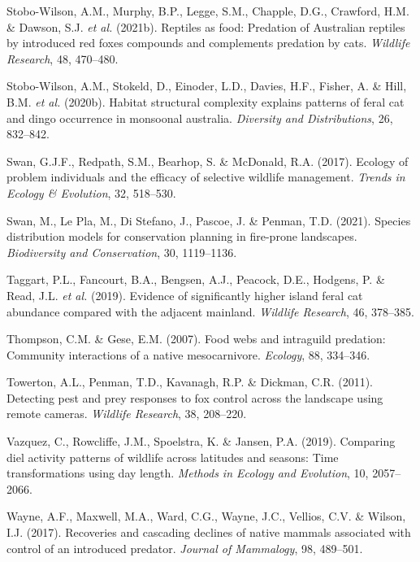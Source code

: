 \documentclass[11pt,a4paper,titlepage,twoside,openright]{style/unimelbthesis}
\begin{document}
\begin{mainmatter}
\leavevmode\hypertarget{ref-stobo2021reptiles}{}%
Stobo-Wilson, A.M., Murphy, B.P., Legge, S.M., Chapple, D.G., Crawford, H.M. \& Dawson, S.J. \emph{et al.} (2021b). Reptiles as food: Predation of Australian reptiles by introduced red foxes compounds and complements predation by cats. \emph{Wildlife Research}, 48, 470--480.

\leavevmode\hypertarget{ref-stobo2020habitat}{}%
Stobo-Wilson, A.M., Stokeld, D., Einoder, L.D., Davies, H.F., Fisher, A. \& Hill, B.M. \emph{et al.} (2020b). Habitat structural complexity explains patterns of feral cat and dingo occurrence in monsoonal australia. \emph{Diversity and Distributions}, 26, 832--842.

\leavevmode\hypertarget{ref-swan2017ecology}{}%
Swan, G.J.F., Redpath, S.M., Bearhop, S. \& McDonald, R.A. (2017). Ecology of problem individuals and the efficacy of selective wildlife management. \emph{Trends in Ecology \& Evolution}, 32, 518--530.

\leavevmode\hypertarget{ref-swan2021species}{}%
Swan, M., Le Pla, M., Di Stefano, J., Pascoe, J. \& Penman, T.D. (2021). Species distribution models for conservation planning in fire-prone landscapes. \emph{Biodiversity and Conservation}, 30, 1119--1136.

\leavevmode\hypertarget{ref-taggart2019evidence}{}%
Taggart, P.L., Fancourt, B.A., Bengsen, A.J., Peacock, D.E., Hodgens, P. \& Read, J.L. \emph{et al.} (2019). Evidence of significantly higher island feral cat abundance compared with the adjacent mainland. \emph{Wildlife Research}, 46, 378--385.

\leavevmode\hypertarget{ref-thompson2007food}{}%
Thompson, C.M. \& Gese, E.M. (2007). Food webs and intraguild predation: Community interactions of a native mesocarnivore. \emph{Ecology}, 88, 334--346.

\leavevmode\hypertarget{ref-towerton2011detecting}{}%
Towerton, A.L., Penman, T.D., Kavanagh, R.P. \& Dickman, C.R. (2011). Detecting pest and prey responses to fox control across the landscape using remote cameras. \emph{Wildlife Research}, 38, 208--220.

\leavevmode\hypertarget{ref-vazquez2019comparing}{}%
Vazquez, C., Rowcliffe, J.M., Spoelstra, K. \& Jansen, P.A. (2019). Comparing diel activity patterns of wildlife across latitudes and seasons: Time transformations using day length. \emph{Methods in Ecology and Evolution}, 10, 2057--2066.

\leavevmode\hypertarget{ref-wayne2017recoveries}{}%
Wayne, A.F., Maxwell, M.A., Ward, C.G., Wayne, J.C., Vellios, C.V. \& Wilson, I.J. (2017). Recoveries and cascading declines of native mammals associated with control of an introduced predator. \emph{Journal of Mammalogy}, 98, 489--501.


\end{mainmatter}
\end{document}
